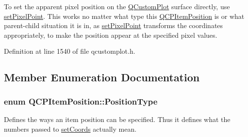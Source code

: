 To set the apparent pixel position on the \hyperlink{class_q_custom_plot}{Q\+Custom\+Plot} surface directly, use \hyperlink{class_q_c_p_item_position_ab404e56d9ac2ac2df0382c57933a71ef}{set\+Pixel\+Point}. This works no matter what type this \hyperlink{class_q_c_p_item_position}{Q\+C\+P\+Item\+Position} is or what parent-\/child situation it is in, as \hyperlink{class_q_c_p_item_position_ab404e56d9ac2ac2df0382c57933a71ef}{set\+Pixel\+Point} transforms the coordinates appropriately, to make the position appear at the specified pixel values. 

Definition at line 1540 of file qcustomplot.\+h.



\subsection{Member Enumeration Documentation}
\hypertarget{class_q_c_p_item_position_aad9936c22bf43e3d358552f6e86dbdc8}{}
\subsubsection[{Position\+Type}]{\setlength{\rightskip}{0pt plus 5cm}enum {\bf Q\+C\+P\+Item\+Position\+::\+Position\+Type}}\label{class_q_c_p_item_position_aad9936c22bf43e3d358552f6e86dbdc8}
Defines the ways an item position can be specified. Thus it defines what the numbers passed to \hyperlink{class_q_c_p_item_position_aa988ba4e87ab684c9021017dcaba945f}{set\+Coords} actually mean.


